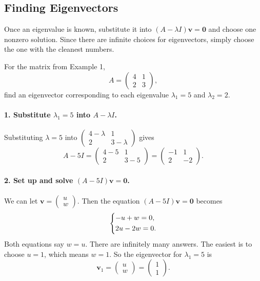 \documentclass[10pt,letterpaper]{article}
\begin{document}

\subsection{Finding Eigenvectors}
Once an eigenvalue is known, substitute it into
$(A-\lambda I)\mathbf{v}=\mathbf{0}$ and choose one nonzero solution. Since there are infinite choices for eigenvectors, simply choose the one with the cleanest numbers.

\begin{example}[3]{
For the matrix from Example 1,
\[
A=
\begin{pmatrix}
4&1\\
2&3
\end{pmatrix},
\]
find an eigenvector corresponding to each eigenvalue
$\lambda_1=5$ and $\lambda_2=2$.
}

\paragraph{1. Substitute $\lambda_1=5$ into $A-\lambda I$.}
Substituting $\lambda = 5$ into $\begin{pmatrix}
4-\lambda&1\\
2&3-\lambda
\end{pmatrix}$ gives
\[
A-5I=
\begin{pmatrix}
    4-5& 1 \\
    2 & 3-5
\end{pmatrix}=
\begin{pmatrix}
-1&1\\
2&-2
\end{pmatrix}.
\]
\paragraph{2. Set up and solve $(A-5 I)\textbf{v}=\textbf{0}$.}
We can let $\mathbf{v}=\begin{pmatrix}u\\w\end{pmatrix}$. Then
the equation $(A-5I)\mathbf{v}=\mathbf{0}$ becomes
\[
\begin{dcases}
-u+w=0,\\
2u-2w=0.
\end{dcases}
\]
Both equations say $w=u$. There are infinitely many answers. The easiest is to choose $u=1$, which means $w=1$. So the eigenvector for $\lambda_1=5$ is
\[
\boxed{
\mathbf{v}_1=\begin{pmatrix}
    u\\w
\end{pmatrix}=\begin{pmatrix}1\\1\end{pmatrix}.
}
\]


\end{example}
\end{document}
